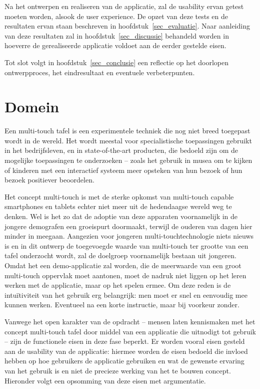 \documentclass{acm}
\begin{document}
Na het ontwerpen en realiseren van de applicatie, zal de usability ervan getest moeten worden, alsook de user experience. De opzet van deze tests en de resultaten ervan staan beschreven in hoofdstuk~\ref{sec_evaluatie}. Naar aanleiding van deze resultaten zal in hoofdstuk~\ref{sec_discussie} behandeld worden in hoeverre de gerealiseerde applicatie voldoet aan de eerder gestelde eisen.

Tot slot volgt in hoofdstuk~\ref{sec_conclusie} een reflectie op het doorlopen ontwerpproces, het eindresultaat en eventuele verbeterpunten.

\section{Domein}
\label{sec_domein}
Een multi-touch tafel is een experimentele techniek die nog niet breed toegepast wordt in de wereld. Het wordt meestal voor specialistische toepassingen gebruikt in het bedrijfsleven, en in state-of-the-art producten, die bedoeld zijn om de mogelijke toepassingen te onderzoeken -- zoals het gebruik in musea om te kijken of kinderen met een interactief systeem meer opsteken van hun bezoek of hun bezoek positiever beoordelen.

Het concept multi-touch is met de sterke opkomst van multi-touch capable smartphones en tablets echter niet meer uit de hedendaagse wereld weg te denken. Wel is het zo dat de adoptie van deze apparaten voornamelijk in de jongere demografen een groeispurt doormaakt, terwijl de ouderen van dagen hier minder in meegaan. Aangezien voor jongeren multi-touchtechnologie niets nieuws is en in dit ontwerp de toegevoegde waarde van multi-touch ter grootte van een tafel onderzocht wordt, zal de doelgroep voornamelijk bestaan uit jongeren. Omdat het een demo-applicatie zal worden, die de meerwaarde van een groot multi-touch oppervlak moet aantonen, moet de nadruk niet liggen op het leren werken met de applicatie, maar op het spelen ermee. Om deze reden is de intu\"itiviteit van het gebruik erg belangrijk: men moet er snel en eenvoudig mee kunnen werken. Eventueel na een korte instructie, maar bij voorkeur zonder.

Vanwege het open karakter van de opdracht -- mensen laten kennismaken met het concept multi-touch tafel door middel van een applicatie die uitnodigt tot gebruik -- zijn de functionele eisen in deze fase beperkt. Er worden vooral eisen gesteld aan de usability van de applicatie: hiermee worden de eisen bedoeld die invloed hebben op hoe gebruikers de applicatie gebruiken en wat de gewenste ervaring van het gebruik is en niet de precieze werking van het te bouwen concept. Hieronder volgt een opsomming van deze eisen met argumentatie.
\end{document}
